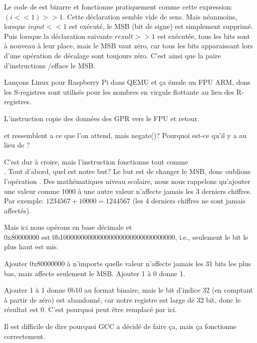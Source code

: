 Le code de  est bizarre et fonctionne pratiquement comme cette expression:
$(i<<1)>>1$.
Cette déclaration semble vide de sens.
Mais néanmoins, lorsque $input<<1$ est exécuté, le \ac{MSB} (bit de signe) est simplement
supprimé.
Puis lorsque la déclaration suivante $result>>1$ est exécutée, tous les bits sont
à nouveau à leur place, mais le \ac{MSB} vaut zéro, car tous les  bits
apparaissant lors d'une opération de décalage sont toujours zéro.
C'est ainsi que la paire d'instructions \LSLS/\LSRS efface le \ac{MSB}.




Lançons Linux pour Raspberry Pi dans QEMU et ça émule un FPU ARM, dons les S-registres
sont utilisés pour les nombres en virgule flottante au lieu des R-registres.


L'instruction \FMRS copie des données des \ac{GPR} vers le FPU et retour.

 et  ressemblent a ce que l'on attend, mais negate()?
Pourquoi est-ce qu'il y a \ADD au lieu de \XOR?

C'est dur à croire, mais l'instruction
 fonctionne tout comme \\
.
Tout d'abord, quel est notre but?
Le but est de changer le \ac{MSB}, donc oublions l'opération \XOR.
Des mathématiques niveau scolaire, nous nous rappelons qu'ajouter une valeur comme
1000 à une autre valeur n'affecte jamais les 3 derniers chiffres.
Par exemple: $1234567 + 10000 = 1244567$ (les 4 derniers chiffres ne sont jamais
affectés).

Mais ici nous opérons en base décimale et\\
0x80000000 est 0b100000000000000000000000000000000, i.e., seulement le bit le plus
haut est mis.

Ajouter 0x80000000 à n'importe quelle valeur n'affecte jamais les 31 bits les plus
bas, mais affecte seulement le \ac{MSB}.
Ajouter 1 à 0 donne 1.

Ajouter 1 à 1 donne 0b10 au format binaire, mais le bit d'indice 32 (en comptant
à partir de zéro) est abandonné, car notre registre est large de 32 bit, donc le
résultat est 0.
C'est pourquoi \XOR peut être remplacé par \ADD ici.

Il est difficile de dire pourquoi GCC a décidé de faire ça, mais ça fonctionne correctement.
